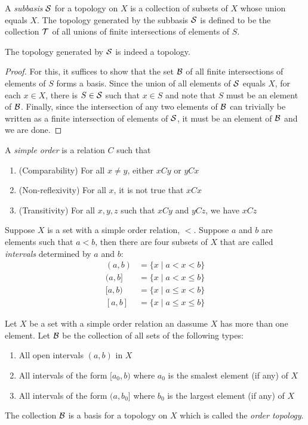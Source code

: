 \begin{definition}[Subbasis]
    A \textit{subbasis} $\S$ for a topology on $X$ is a collection of subsets of $X$ whose union equals $X$. The topology generated by the subbasis $\S$ is defined to be the collection $\T$ of all unions of finite intersections of elements of $S$.
\end{definition}

\begin{proposition}
    The topology generated by $\S$ is indeed a topology.
\end{proposition}
\begin{proof}
    For this, it suffices to show that the set $\B$ of all finite intersections of elements of $S$ forms a basis. Since the union of all elements of $\S$ equals $X$, for each $x\in X$, there is $S\in\S$ such that $x\in S$ and note that $S$ must be an element of $\B$. Finally, since the intersection of any two elements of $\B$ can trivially be written as a finite intersection of elements of $\S$, it must be an element of $\B$ and we are done.
\end{proof}

A \textit{simple order} is a relation $C$ such that 
\begin{enumerate}
    \item (Comparability) For all $x\ne y$, either $xCy$ or $yCx$ 
    \item (Non-reflexivity) For all $x$, it is not true that $xCx$
    \item (Transitivity) For all $x,y,z$ such that $xCy$ and $yCz$, we have $xCz$
\end{enumerate}

Suppose $X$ is a set with a simple order relation, $<$. Suppose $a$ and $b$ are elements such that $a < b$, then there are four subsets of $X$ that are called \textit{intervals} determined by $a$ and $b$:
\begin{align*}
    (a,b) &= \{x\mid a < x < b\}\\
    (a,b] &= \{x\mid a < x \le b\}\\
    [a,b) &= \{x\mid a \le x < b\}\\
    [a,b] &= \{x\mid a \le x \le b\}
\end{align*}

\begin{definition}
    Let $X$ be a set with a simple order relation an dassume $X$ has more than one element. Let $\B$ be the collection of all sets of the following types: 
    \begin{enumerate}
        \item All open intervals $(a,b)$ in $X$
        \item All intervals of the form $[a_0,b)$ where $a_0$ is the smalest element (if any) of $X$ 
        \item All intervals of the form $(a,b_0]$ where $b_0$ is the largest element (if any) of $X$
    \end{enumerate}
    The collection $\B$ is a basis for a topology on $X$ which is called the \textit{order topology}.
\end{definition}

